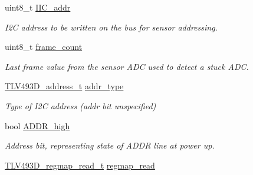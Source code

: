 \begin{DoxyCompactItemize}
\item 
\mbox{\label{struct_t_l_v493_d__data__t_a047c4ab12450e0186489f3bfadc8cbc4}} 
uint8\+\_\+t \mbox{\hyperlink{struct_t_l_v493_d__data__t_a047c4ab12450e0186489f3bfadc8cbc4}{I\+I\+C\+\_\+addr}}
\begin{DoxyCompactList}\small\item\em I2C address to be written on the bus for sensor addressing. \end{DoxyCompactList}\item 
\mbox{\label{struct_t_l_v493_d__data__t_ae3fa7cdfdb0d25150ef720ed5bfd454e}} 
uint8\+\_\+t \mbox{\hyperlink{struct_t_l_v493_d__data__t_ae3fa7cdfdb0d25150ef720ed5bfd454e}{frame\+\_\+count}}
\begin{DoxyCompactList}\small\item\em Last frame value from the sensor A\+DC used to detect a stuck A\+DC. \end{DoxyCompactList}\item 
\mbox{\label{struct_t_l_v493_d__data__t_a8a51c7727a7a5f47c292448920dbe223}} 
\mbox{\hyperlink{_t_l_v___a1_b6_8h_a8feabf3c07e764c773a5632a3f72461b}{T\+L\+V493\+D\+\_\+address\+\_\+t}} \mbox{\hyperlink{struct_t_l_v493_d__data__t_a8a51c7727a7a5f47c292448920dbe223}{addr\+\_\+type}}
\begin{DoxyCompactList}\small\item\em Type of I2C address (addr bit unspecified) \end{DoxyCompactList}\item 
\mbox{\label{struct_t_l_v493_d__data__t_a4588d378150e39eedf7c85afb5cb6354}} 
bool \mbox{\hyperlink{struct_t_l_v493_d__data__t_a4588d378150e39eedf7c85afb5cb6354}{A\+D\+D\+R\+\_\+high}}
\begin{DoxyCompactList}\small\item\em Address bit, representing state of A\+D\+DR line at power up. \end{DoxyCompactList}\item 
\mbox{\label{struct_t_l_v493_d__data__t_a8160052cc383f9ec602c96f41922952b}} 
\mbox{\hyperlink{struct_t_l_v493_d__regmap__read__t}{T\+L\+V493\+D\+\_\+regmap\+\_\+read\+\_\+t}} \mbox{\hyperlink{struct_t_l_v493_d__data__t_a8160052cc383f9ec602c96f41922952b}{regmap\+\_\+read}}

\end{DoxyCompactItemize}
